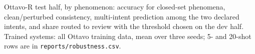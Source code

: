 \begin{table}[t]
\centering\small
\caption{Ottavo-R test half, by phenomenon: accuracy for closed-set phenomena, clean/perturbed consistency, multi-intent prediction
among the two declared intents, and share routed to review with the threshold chosen on the dev half. Trained systems: all Ottavo training data, mean over three seeds; 5- and 20-shot rows are in \texttt{reports/robustness.csv}.}
\label{tab:robust}
\resizebox{\linewidth}{!}{}
\end{table}
